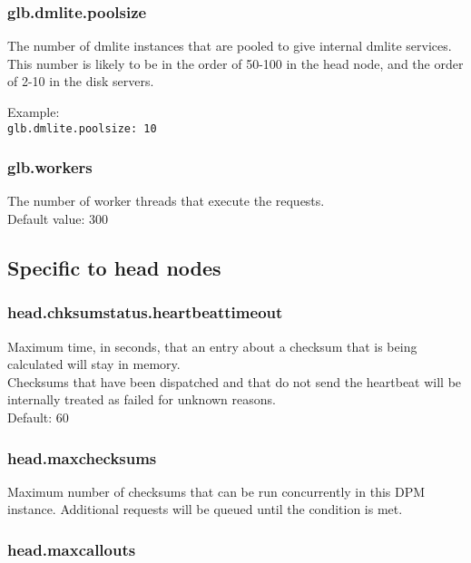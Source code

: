 \documentclass[a4paper,10pt]{scrreprt}
\begin{document}
\subsubsection{glb.dmlite.poolsize}

The number of dmlite instances that are pooled to give internal dmlite services. This number is likely to be in the order of 50-100 in the head node, and the order of 2-10 in the disk servers.

 Example:\\
\lstinline"glb.dmlite.poolsize: 10"\\

\subsubsection{glb.workers}

The number of worker threads that execute the requests.\\
Default value: 300\\




\subsection{Specific to head nodes}

\subsubsection{head.chksumstatus.heartbeattimeout}
Maximum time, in seconds, that an entry about a checksum that is being calculated will stay in memory.\\
Checksums that have been dispatched and that do not send the heartbeat will be internally treated as failed for unknown reasons.\\
Default: 60\\

\subsubsection{head.maxchecksums}

Maximum number of checksums that can be run concurrently in this DPM instance. Additional requests will be queued until the condition is met.\\

\subsubsection{head.maxcallouts}
\end{document}
